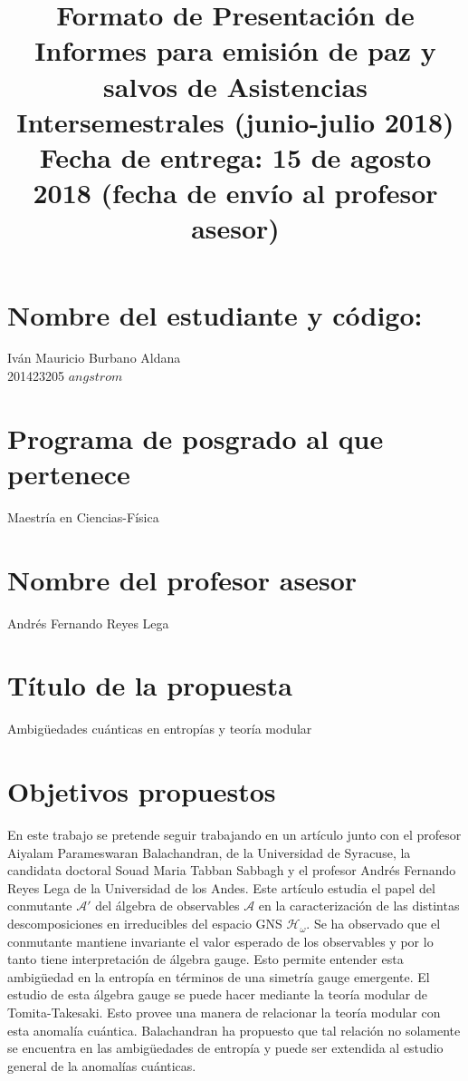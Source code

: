 \documentclass{article}
\title{Formato de Presentación de Informes para emisión de paz y salvos de Asistencias Intersemestrales (junio-julio 2018)
\\
Fecha de entrega: 15 de agosto 2018 (fecha de envío al profesor asesor)}
\author{}
\date{}
\begin{document}
\maketitle

\section{Nombre del estudiante y código:}

Iván Mauricio Burbano Aldana\\
201423205
$\si{angstrom}$

\section{Programa de posgrado al que pertenece}

Maestría en Ciencias-Física

\section{Nombre del profesor asesor}

Andrés Fernando Reyes Lega

\section{Título de la propuesta}

Ambigüedades cuánticas en entropías y teoría modular

\section{Objetivos propuestos}

En este trabajo se pretende seguir trabajando en un artículo junto con el profesor Aiyalam Parameswaran Balachandran, de la Universidad de Syracuse, la candidata doctoral Souad Maria Tabban Sabbagh y el profesor Andrés Fernando Reyes Lega de la Universidad de los Andes. Este artículo estudia el papel del conmutante $\mathcal{A}'$ del álgebra de observables $\mathcal{A}$ en la caracterización de las distintas descomposiciones en irreducibles del espacio GNS $\mathcal{H}_\omega$. Se ha observado que el conmutante mantiene invariante el valor esperado de los observables y por lo tanto tiene interpretación de álgebra gauge. Esto permite entender esta ambigüedad en la entropía en términos de una simetría gauge emergente. El estudio de esta álgebra gauge se puede hacer mediante la teoría modular de Tomita-Takesaki. Esto provee una manera de relacionar la teoría modular con esta anomalía cuántica. Balachandran ha propuesto que tal relación no solamente se encuentra en las ambigüedades de entropía y puede ser extendida al estudio general de la anomalías cuánticas.
\end{document}
